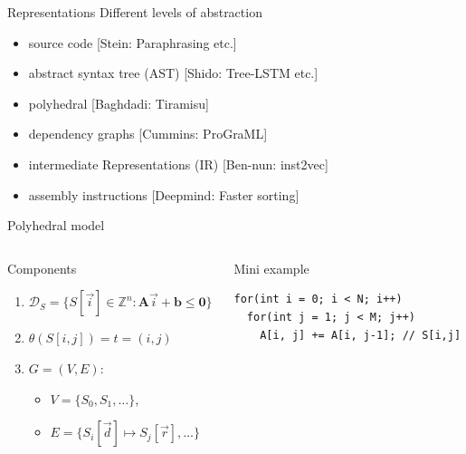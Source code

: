 \documentclass[presentation, aspectratio=169]{beamer}
\begin{document}
\begin{frame}[label={sec:org2dfab17}]{Representations}
Different levels of abstraction
\begin{itemize}
\item source code [Stein: Paraphrasing etc.]
\item abstract syntax tree (AST) [Shido: Tree-LSTM etc.]
\item polyhedral [Baghdadi: Tiramisu]
\item dependency graphs [Cummins: ProGraML]
\item intermediate Representations (IR) [Ben-nun: inst2vec]
\item assembly instructions [Deepmind: Faster sorting]
\end{itemize}
\end{frame}
\begin{frame}[label={sec:org58a6caa},fragile]{Polyhedral model}
 \begin{columns}
\begin{column}{0.45\columnwidth}
\begin{block}{Components}
\begin{enumerate}
\item \(\mathcal{D}_S = \{ S[\vec{i}] \in \mathbb{Z}^n : \mathbf{A} \vec{i} + \mathbf{b} \le \mathbf{0}  \}\)
\item \(\theta(S[i, j]) = t = (i, j)\)
\item \(G=(V, E)\):
\begin{itemize}
\item \(V=\{ S_0, S_1, \ldots\}\),
\item \(E=\{ S_i[\vec{d}] \mapsto S_j[\vec{r}], \ldots \}\)
\end{itemize}
\end{enumerate}
\end{block}
\end{column}
\begin{column}{0.45\columnwidth}
\begin{block}{Mini example}
\begin{verbatim}
for(int i = 0; i < N; i++)
  for(int j = 1; j < M; j++)
    A[i, j] += A[i, j-1]; // S[i,j]
\end{verbatim}
\end{block}
\end{column}
\end{columns}
\end{frame}
\end{document}

